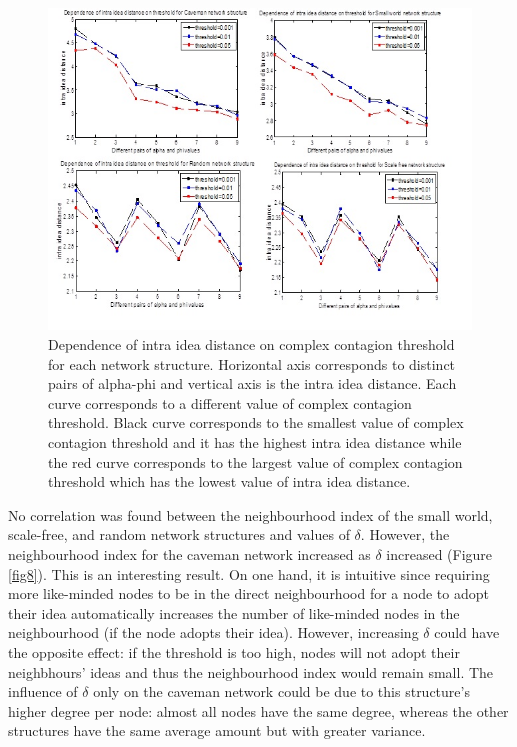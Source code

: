 \begin{figure}
[htp]
\begin{center}
\includegraphics{Fig7}
\end{center}
\caption{Dependence of intra idea distance on complex contagion threshold for each network structure. Horizontal axis corresponds to distinct pairs of alpha-phi and   vertical axis is the intra idea distance. Each curve corresponds to a different value of complex contagion threshold. Black curve corresponds to the smallest value of complex contagion threshold and it has the highest intra idea distance while the red curve corresponds to the largest value of complex contagion threshold which has the lowest value of intra idea distance.}
\label {fig7}
\end{figure}

No correlation was found between the neighbourhood index of the small world, scale-free, and random network structures and values of $\delta$. However, the neighbourhood index for the caveman network increased as $\delta$ increased (Figure \ref{fig8}). This is an interesting result. On one hand, it is intuitive since requiring more like-minded nodes to be in the direct neighbourhood for a node to adopt their idea automatically increases the number of like-minded nodes in the neighbourhood (if the node adopts their idea). However, increasing $\delta$ could have the opposite effect: if the threshold is too high, nodes will not adopt their neighbhours' ideas and thus the neighbourhood index would remain small. The influence of $\delta$ only on the caveman network could be due to this structure's higher degree per node: almost all nodes have the same degree, whereas the other structures have the same average amount but with greater variance.

